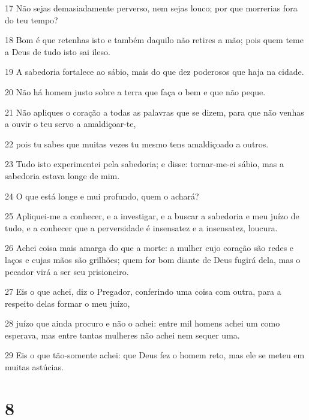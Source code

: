\par 17 Não sejas demasiadamente perverso, nem sejas louco; por que morrerias fora do teu tempo?
\par 18 Bom é que retenhas isto e também daquilo não retires a mão; pois quem teme a Deus de tudo isto sai ileso.
\par 19 A sabedoria fortalece ao sábio, mais do que dez poderosos que haja na cidade.
\par 20 Não há homem justo sobre a terra que faça o bem e que não peque.
\par 21 Não apliques o coração a todas as palavras que se dizem, para que não venhas a ouvir o teu servo a amaldiçoar-te,
\par 22 pois tu sabes que muitas vezes tu mesmo tens amaldiçoado a outros.
\par 23 Tudo isto experimentei pela sabedoria; e disse: tornar-me-ei sábio, mas a sabedoria estava longe de mim.
\par 24 O que está longe e mui profundo, quem o achará?
\par 25 Apliquei-me a conhecer, e a investigar, e a buscar a sabedoria e meu juízo de tudo, e a conhecer que a perversidade é insensatez e a insensatez, loucura.
\par 26 Achei coisa mais amarga do que a morte: a mulher cujo coração são redes e laços e cujas mãos são grilhões; quem for bom diante de Deus fugirá dela, mas o pecador virá a ser seu prisioneiro.
\par 27 Eis o que achei, diz o Pregador, conferindo uma coisa com outra, para a respeito delas formar o meu juízo,
\par 28 juízo que ainda procuro e não o achei: entre mil homens achei um como esperava, mas entre tantas mulheres não achei nem sequer uma.
\par 29 Eis o que tão-somente achei: que Deus fez o homem reto, mas ele se meteu em muitas astúcias.

\chapter{8}

